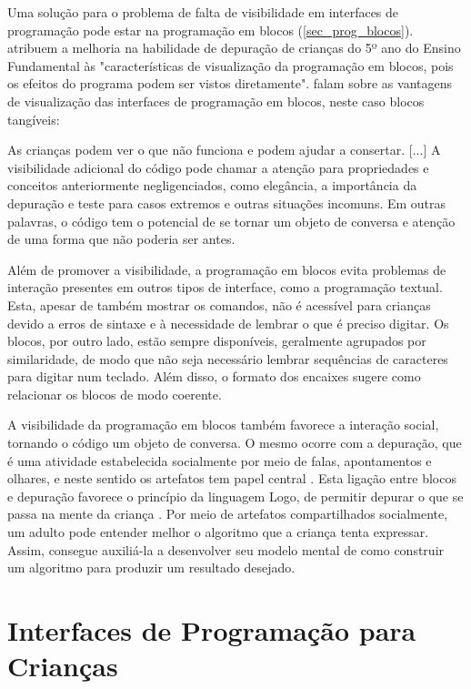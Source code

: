 Uma solução para o problema de falta de visibilidade em interfaces de programação pode estar na programação em blocos (\autoref{sec_prog_blocos}).  atribuem a melhoria na habilidade de depuração de crianças do 5º ano do Ensino Fundamental às "características de visualização da programação em blocos, pois os efeitos do programa podem ser vistos diretamente".  falam sobre as vantagens de visualização das interfaces de programação em blocos, neste caso blocos tangíveis:

\begin{citacao}
As crianças podem ver o que não funciona e podem ajudar a consertar. [...] A visibilidade adicional do código pode chamar a atenção para propriedades e conceitos anteriormente negligenciados, como elegância, a importância da depuração e teste para casos extremos e outras situações incomuns. Em outras palavras, o código tem o potencial de se tornar um objeto de conversa e atenção de uma forma que não poderia ser antes. \cite[p.14, tradução nossa]{bers_coding_2019}
\end{citacao}

Além de promover a visibilidade, a programação em blocos evita problemas de interação presentes em outros tipos de interface, como a programação textual.
Esta, apesar de também mostrar os comandos, não é acessível para crianças devido a erros de sintaxe e à necessidade de lembrar o que é preciso digitar. Os blocos, por outro lado, estão sempre disponíveis, geralmente agrupados por similaridade, de modo que não seja necessário lembrar sequências de caracteres para digitar num teclado. Além disso, o formato dos encaixes sugere como relacionar os blocos de modo coerente. 

A visibilidade da programação em blocos também favorece a interação social, tornando o código um objeto de conversa. O mesmo ocorre com a depuração, que é uma atividade estabelecida socialmente por meio de falas, apontamentos e olhares, e neste sentido os artefatos tem papel central \cite{heikkila_debugging_2018}. Esta ligação entre blocos e depuração favorece o princípio da linguagem Logo, de permitir depurar o que se passa na mente da criança \cite{solomon_history_2020}. Por meio de artefatos compartilhados socialmente, um adulto pode entender melhor o algoritmo que a criança tenta expressar. Assim, consegue auxiliá-la a desenvolver seu modelo mental de como construir um algoritmo para produzir um resultado desejado.

\section{Interfaces de Programação para Crianças}
\label{section_interfaces}

